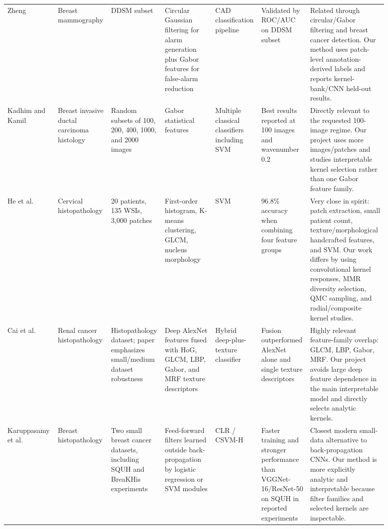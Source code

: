 \documentclass[9pt]{article}
\begin{document}
\begin{longtable}{p{0.13\linewidth}p{0.13\linewidth}p{0.10\linewidth}p{0.13\linewidth}p{0.10\linewidth}p{0.10\linewidth}p{0.20\linewidth}}
Zheng \cite{zheng2010} & Breast mammography & DDSM subset & Circular Gaussian filtering for alarm generation plus Gabor features for false-alarm reduction & CAD classification pipeline & Validated by ROC/AUC on DDSM subset & Related through circular/Gabor filtering and breast cancer detection. Our method uses patch-level annotation-derived labels and reports kernel-bank/CNN held-out results. \\

Kadhim and Kamil \cite{kadhim2023} & Breast invasive ductal carcinoma histology & Random subsets of 100, 200, 400, 1000, and 2000 images & Gabor statistical features & Multiple classical classifiers including SVM & Best results reported at 100 images and wavenumber 0.2 & Directly relevant to the requested 100-image regime. Our project uses more images/patches and studies interpretable kernel selection rather than one Gabor feature family. \\

He et al. \cite{he2023} & Cervical histopathology & 20 patients, 135 WSIs, 3,000 patches & First-order histogram, K-means clustering, GLCM, nucleus morphology & SVM & 96.8\% accuracy when combining four feature groups & Very close in spirit: patch extraction, small patient count, texture/morphological handcrafted features, and SVM. Our work differs by using convolutional kernel responses, MMR diversity selection, QMC sampling, and radial/composite kernel studies. \\

Cai et al. \cite{cai2022} & Renal cancer histopathology & Histopathology dataset; paper emphasizes small/medium dataset robustness & Deep AlexNet features fused with HoG, GLCM, LBP, Gabor, and MRF texture descriptors & Hybrid deep-plus-texture classifier & Fusion outperformed AlexNet alone and single texture descriptors & Highly relevant feature-family overlap: GLCM, LBP, Gabor, MRF. Our project avoids large deep feature dependence in the main interpretable model and directly selects analytic kernels. \\

Karuppasamy et al. \cite{karuppasamy2024} & Breast histopathology & Two small breast cancer datasets, including SQUH and BreaKHis experiments & Feed-forward filters learned outside back-propagation by logistic regression or SVM modules & CLR / CSVM-H & Faster training and stronger performance than VGGNet-16/ResNet-50 on SQUH in reported experiments & Closest modern small-data alternative to back-propagation CNNs. Our method is more explicitly analytic and interpretable because filter families and selected kernels are inspectable. \\


\end{longtable}
\end{document}
